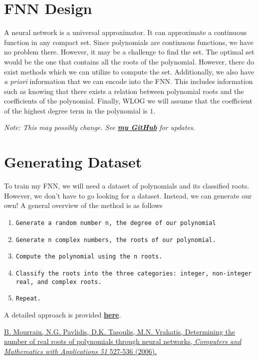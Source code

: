 \documentclass{article}
\begin{document}
\section{FNN Design}
A neural network is a universal approximator. It can approximate a continuous function in any compact set. Since polynomials are continuous functions, we have no problem there. However, it may be a challenge to find the set. The optimal set would be the one that contains all the roots of the polynomial. However, there do exist methods which we can utilize to compute the set. Additionally, we also have \textit{a priori} information that we can encode into the FNN. This includes information such as knowing that there exists a relation between polynomial roots and the coefficients of the polynomial. Finally, WLOG we will assume that the coefficient of the highest degree term in the polynomial is $1$.
\vspace{8pt}

\noindent \textit{Note: This may possibly change. See \href{https://github.com/yagnapatel/ML-Research-Project/}{\textbf{my GitHub}} for updates.}

\section{Generating Dataset}
To train my FNN, we will need a dataset of polynomials and its classified roots. However, we don't have to go looking for a dataset. Instead, we can generate our own! A general overview of the method is as follows
\begin{enumerate}
\item \begin{verbatim}Generate a random number n, the degree of our polynomial\end{verbatim}
\item \begin{verbatim}Generate n complex numbers, the roots of our polynomial.\end{verbatim}
\item \begin{verbatim}Compute the polynomial using the n roots.\end{verbatim}
\item \begin{verbatim}Classify the roots into the three categories: integer, non-integer real, and complex roots.\end{verbatim}
\item \begin{verbatim}Repeat.\end{verbatim}
\end{enumerate}
A detailed approach is provided \href{https://github.com/yagnapatel/ML-Research-Project/blob/master/Generating_Dataset.ipynb}{\textbf{here}}.

\begin{thebibliography}{999}
\href{https://www.sciencedirect.com/science/article/pii/S0898122105005195}{B. Mourrain, N.G. Pavlidis, D.K. Tasoulis, M.N. Vrahatis, Determining the number of real roots of polynomials through neural networks, \textit{Computers and
Mathematics with Applications 51} 527-536 (2006).}
\end{thebibliography}
\end{document}
